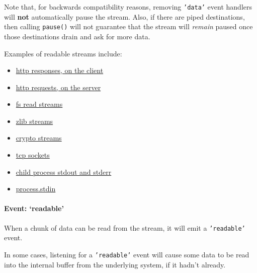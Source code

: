 Note that, for backwards compatibility reasons, removing \texttt{'data'}
event handlers will \textbf{not} automatically pause the stream. Also,
if there are piped destinations, then calling \texttt{pause()} will not
guarantee that the stream will \emph{remain} paused once those
destinations drain and ask for more data.

Examples of readable streams include:

\begin{itemize}
\itemsep1pt\parskip0pt
\item
  \href{http.html\#http_http_incomingmessage}{http responses, on the
  client}
\item
  \href{http.html\#http_http_incomingmessage}{http requests, on the
  server}
\item
  \href{fs.html\#fs_class_fs_readstream}{fs read streams}
\item
  \href{zlib.html}{zlib streams}
\item
  \href{crypto.html}{crypto streams}
\item
  \href{net.html\#net_class_net_socket}{tcp sockets}
\item
  \href{child_process.html\#child_process_child_stdout}{child process
  stdout and stderr}
\item
  \href{process.html\#process_process_stdin}{process.stdin}
\end{itemize}

\paragraph{Event: `readable'}\label{event-readable}

When a chunk of data can be read from the stream, it will emit a
\texttt{'readable'} event.

In some cases, listening for a \texttt{'readable'} event will cause some
data to be read into the internal buffer from the underlying system, if
it hadn't already.

\begin{Shaded}
\begin{Highlighting}[]
 \NormalTok{();}
\NormalTok{(}\NormalTok{, }\NormalTok{() \{}
\NormalTok{\})}
\end{Highlighting}
\end{Shaded}

